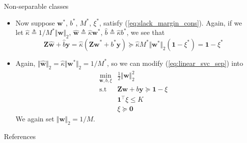 \documentclass{beamer}
\numberwithin{equation}{section}
\newcommand{\aref}[1]{\alert{\ref{#1}}}
\begin{document}
\begin{frame}{Non-separable classes}
    \begin{itemize}
        \item
        Now suppose $ \mathbf{w}^* $,  $ b^* $, $ M^* $, $ \xi^* $, satisfy
        (\aref{eq:slack_margin_cons}). Again, if we let $ \hat{\kappa}
        \triangleq 1 / M^*\Vert\mathbf{w}\Vert_2 $, $ \hat{\mathbf{w}}
        \triangleq \hat{\kappa}\mathbf{w}^* $, $ \hat{b} \triangleq
        \hat{\kappa}b^* $, we see that
        \begin{equation*}
            \mathbf{Z}\hat{\mathbf{w}} + \hat{b}\mathbf{y} =
            \hat{\kappa}(\mathbf{Zw}^* + b^*\mathbf{y}) \succeq
            \hat{\kappa}M^*\Vert\mathbf{w}^*\Vert_2(\mathbf{1} - \xi^*) =
            \mathbf{1} - \xi^*
        \end{equation*}

        \item
        Again, $ \Vert\hat{\mathbf{w}}\Vert_2 =
        \hat{\kappa}\Vert\mathbf{w}^*\Vert_2 = 1 / M^* $, so we can modify
        (\aref{eq:linear_svc_sep}) into
        \begin{equation} \label{eq:linear_svc_nonsep}
            \begin{array}{ll}
                \displaystyle\min_{\mathbf{w}, b, \xi} &
                \frac{1}{2}\Vert\mathbf{w}\Vert_2^2 \\
                \text{s.t} & 
                \mathbf{Zw} + b\mathbf{y} \succeq \mathbf{1} - \xi \\
                & \mathbf{1}^\top\xi \le K \\
                & \xi \succeq \mathbf{0}
            \end{array}
        \end{equation}
        We again set $ \Vert\mathbf{w}\Vert_2 = 1 / M $.
    \end{itemize}
\end{frame}

%
%

\begin{frame}{References}
    
    
\end{frame}
\end{document}
